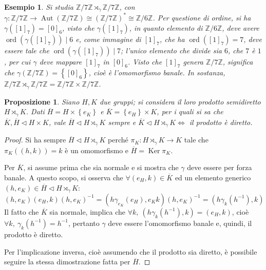 \documentclass[11pt]{article}
\theoremstyle{style}
\newtheorem{esempio}{Esempio}[section]
\newtheorem{prop}{Proposizione}[section]
\numberwithin{equation}{subsection}
\begin{document}
\begin{esempio}
Si studia $\mathbb{Z}/ 7\mathbb{Z} \rtimes _\gamma \mathbb{Z}/7\mathbb{Z}$, con $\gamma : \mathbb{Z} / 7\mathbb{Z}\to \operatorname{Aut} (\mathbb{Z}/7\mathbb{Z})\cong(\mathbb{Z}/7\mathbb{Z})^*\cong \mathbb{Z}/6\mathbb{Z}$.
Per questione di ordine, si ha $\gamma([1]_7) = [0]_6$, visto che $\gamma([1]_7)$, in quanto elemento di $\mathbb{Z}/6\mathbb{Z}$, deve avere $\operatorname{ord}(\gamma([1]_7))  \mid 6$ e, come immagine di $[1]_7$, che ha $\operatorname{ord}([1]_7) = 7$, deve essere tale che $\operatorname{ord}(\gamma([1]_7))  \mid 7$; l'unico elemento che divide sia $6$, che $7$ \`e $1$, per cui $\gamma$ deve mappare $[1]_7 $ in $[0]_6$.
Visto che $[1]_7$ genera $\mathbb{Z}/7\mathbb{Z}$, significa che $\gamma(\mathbb{Z}/7\mathbb{Z})=\left\{ [0]_6 \right\} $, cio\`e \`e l'omomorfismo banale.
In sostanza, $\mathbb{Z}/7\mathbb{Z}\rtimes _\gamma \mathbb{Z}/ 7\mathbb{Z} = \mathbb{Z}/7\mathbb{Z} \times \mathbb{Z}/7\mathbb{Z}$.
\end{esempio}
\begin{prop}
	Siano $H,K$ due gruppi; si considera il loro prodotto semidiretto $H\rtimes _\gamma K$. 
Dati $\overline{H}= H \times \left\{ e_K \right\} $ e $\overline{K}= \left\{ e_H \right\} \times K$, per i quali si sa che $\overline{K},\overline{H}\lhd H \times K$, vale $\overline{H}\lhd H \rtimes _\gamma K$ sempre e $\overline{K}\lhd H \rtimes _\gamma K \iff $ il prodotto \`e diretto.
\end{prop}
\begin{proof}
	Si ha sempre $\overline{H}\lhd H\rtimes _\gamma K$ perch\'e $\pi_K : H \rtimes _\gamma K \to K$ tale che $\pi_K((h,k)) = k$ \`e un omomorfismo e $\overline{H} = \operatorname{Ker} \pi_K$.
	
	Per $\overline{K}$, si assume prima che sia normale e si mostra che $\gamma$ deve essere per forza banale.
	A questo scopo, si osserva che $\forall (e_H, k) \in \overline{K}$ ed un elemento generico $(h,e_K) \in \overline{H}\lhd H \rtimes _\gamma K$:
	\[
		(h,e_K)(e_H,k)(h,e_K)^{-1}=(h \gamma_{e_K} (e_H), e_K k)(h,e_K)^{-1} = (h \gamma_k(h^{-1}),k)
	\] 
	Il fatto che $\overline{K}$ sia normale, implica che $\forall k, \ (h\gamma_k(h^{-1}),k)=(e_H,k)$, cio\`e $\forall k, \ \gamma_k(h^{-1}) = h^{-1}$, pertanto $\gamma$ deve essere l'omomorfismo banale e, quindi, il prodotto \`e diretto.

	Per l'implicazione inversa, cio\`e assumendo che il prodotto sia diretto, \`e possibile seguire la stessa dimostrazione fatta per $\overline{H}$.
\end{proof}
\end{document}
